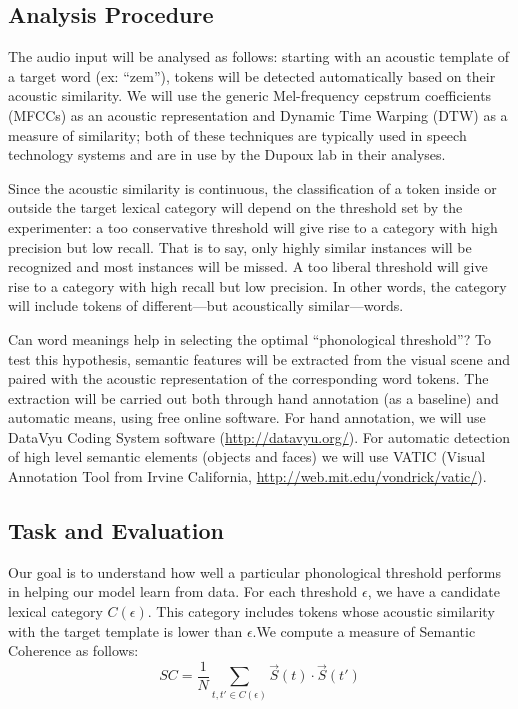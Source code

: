 \documentclass[12pt]{article}
\begin{document}
\subsection{Analysis Procedure}

The audio input will be analysed as follows:  starting with an acoustic template of a target word (ex: ``zem''), tokens will be detected automatically based on their acoustic similarity. We will use the generic Mel-frequency cepstrum coefficients (MFCCs) as an acoustic representation and Dynamic Time Warping (DTW) as a measure of similarity; both of these techniques are typically used in speech technology systems and are in use by the Dupoux lab in their analyses. 

Since the acoustic similarity is continuous, the classification of a token inside or outside the target lexical category will depend on the threshold set by the experimenter: a too conservative threshold will give rise to a category with high precision but low recall. That is to say, only highly similar instances will be recognized and most instances will be missed. A too liberal threshold will give rise to a category with high recall but low precision. In other words, the category will include tokens of different---but acoustically similar---words.

Can word meanings help in selecting the optimal ``phonological threshold''? To test this hypothesis, semantic features will be extracted from the visual scene and paired with the acoustic representation of the corresponding word tokens. The extraction will be carried out both through hand annotation (as a baseline) and automatic means, using free online software. For hand annotation, we will use DataVyu Coding System software (\url{http://datavyu.org/}). For automatic detection of high level semantic elements (objects and faces) we will use VATIC (Visual Annotation Tool from Irvine California, \url{http://web.mit.edu/vondrick/vatic/}). 

\subsection{Task and Evaluation}

Our goal is to understand how well a particular phonological threshold performs in helping our model learn from data. For each threshold $\epsilon$,  we have a candidate lexical category $C(\epsilon)$. This category includes tokens whose acoustic similarity with the target template is lower than $\epsilon$.We compute a measure of Semantic Coherence as follows:
$$
SC = \frac{1}{N} \sum_{t,t' \in C( \epsilon ) } {\vec{S}(t) \cdot \vec{S}(t')}
$$
\end{document}
